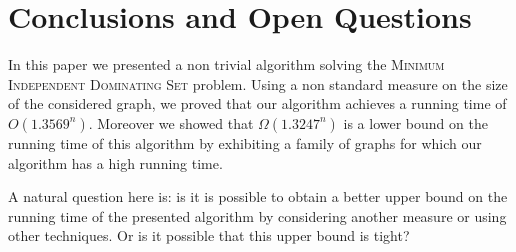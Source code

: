 \documentclass[a4paper,10pt]{article}
\theoremstyle{plain}
\theoremstyle{definition}
\theoremstyle{remark}
\newcommand{\runtime}{1.3569}
\begin{document}
\section{Conclusions and Open Questions}


In this paper we presented a non trivial algorithm solving
the \textsc{Minimum Independent Dominating Set} problem. Using a non standard measure on
the size of the considered graph, we proved that our algorithm achieves a running
time of $O(\runtime^n)$. Moreover we showed that $\Omega(1.3247^n)$ is a lower bound on
the running time of this algorithm by exhibiting a family of graphs for which
our algorithm has a high running time.

A natural question here is: is it is possible to obtain a better upper bound on
the running time of the presented algorithm by considering another measure or
using other techniques. Or is it possible that this upper bound is tight?
\end{document}
